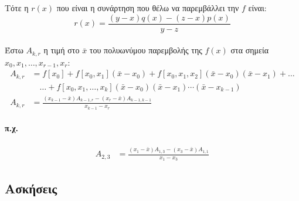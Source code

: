 \documentclass[11pt,a4paper,notitlepage,fleqn,final]{article}
\begin{document}
 	Τότε η \( r(x) \) που είναι η συνάρτηση που θέλω να
 	παρεμβάλλει την \( f \) είναι:
 	\[
 	\boxed{
 	r(x) = \frac{(y-x)q(x) - (z-x)p(x)}{y-z}
    }
 	\]

 	\paragraph{}
 	Έστω \( A_{k,r} \) η τιμή στο \( \bar x \) του πολυωνύμου
 	παρεμβολής της \( f(x) \) στα σημεία \( x_0,x_1,
 	\dots,x_{r-1},x_r \):
 	\begin{align*}
 	A_{k,r} &= f[x_0] + f[x_0,x_1](\bar x-x_0)
 	+ f[x_0,x_1,x_2](\bar x-x_0)(\bar x-x_1) + \dots
 	\\ &\quad \dots + f[x_0,x_1,\dots,x_k](\bar x-x_0)
 	(\bar x-x_1)\cdots(\bar x-x_{k-1}) \\
 	A_{k,r} &= \frac{(x_{k-1}-\bar x)A_{k-1,r}
 		-(x_r-\bar x)A_{k-1,k-1}}{x_{k-1}-x_r}
	\end{align*}




	\paragraph{π.χ.}
	\begin{align*}
		A_{2,3} &=
		\frac{(x_1-\bar x)A_{1,3}-(x_3-\bar x)A_{1,1}}{x_1-x_3}
	\end{align*}

	\subsection{Ασκήσεις}
\end{document}

